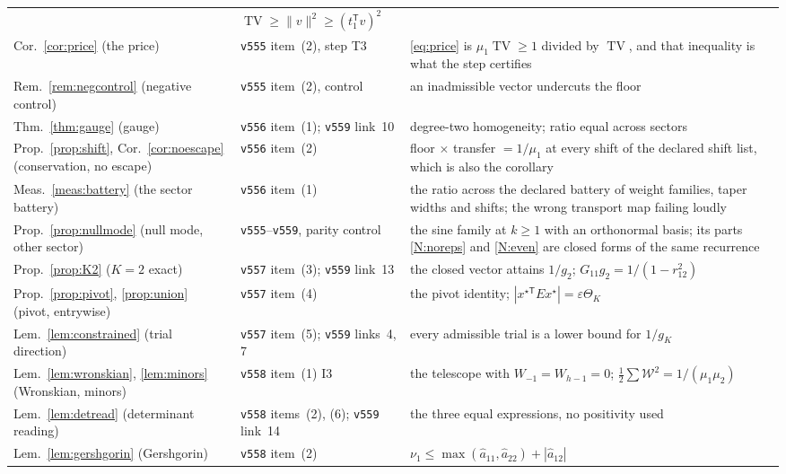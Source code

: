 \documentclass[11pt,a4paper]{article}
\theoremstyle{plain}
\theoremstyle{definition}
\newcommand{\T}{\mathsf{T}}
\newcommand{\ah}{\widehat{a}}
\newcommand{\TV}{\operatorname{TV}}
\begin{document}
{\begin{xltabular}{\textwidth}{@{}llY@{}}
  & $\TV\ge\lVert v\rVert^{2}\ge(t_1^{\T}v)^{2}$ \\
Cor.~\ref{cor:price} (the price)
  & \texttt{v555} item~(2), step T3
  & \eqref{eq:price} is $\mu_1\TV\ge1$ divided by $\TV$, and that inequality is
    what the step certifies \\
Rem.~\ref{rem:negcontrol} (negative control)
  & \texttt{v555} item~(2), control
  & an inadmissible vector undercuts the floor \\
Thm.~\ref{thm:gauge} (gauge)
  & \texttt{v556} item~(1); \texttt{v559} link~10
  & degree-two homogeneity; ratio equal across sectors \\
Prop.~\ref{prop:shift}, Cor.~\ref{cor:noescape} (conservation, no escape)
  & \texttt{v556} item~(2)
  & floor $\times$ transfer $=1/\mu_1$ at every shift of the declared shift
    list, which is also the corollary \\
Meas.~\ref{meas:battery} (the sector battery)
  & \texttt{v556} item~(1)
  & the ratio across the declared battery of weight families, taper widths and
    shifts; the wrong transport map failing loudly \\
Prop.~\ref{prop:nullmode} (null mode, other sector)
  & \texttt{v555}--\texttt{v559}, parity control
  & the sine family at $k\ge1$ with an orthonormal basis; its parts
    \ref{N:noreps} and \ref{N:even} are closed forms of the same recurrence \\
Prop.~\ref{prop:K2} ($K=2$ exact)
  & \texttt{v557} item~(3); \texttt{v559} link~13
  & the closed vector attains $1/g_2$; $G_{11}g_2=1/(1-r_{12}^{2})$ \\
Prop.~\ref{prop:pivot}, \ref{prop:union} (pivot, entrywise)
  & \texttt{v557} item~(4)
  & the pivot identity; $|x^{\star\T}Ex^{\star}|=\varepsilon\Theta_K$ \\
Lem.~\ref{lem:constrained} (trial direction)
  & \texttt{v557} item~(5); \texttt{v559} links~4, 7
  & every admissible trial is a lower bound for $1/g_K$ \\
Lem.~\ref{lem:wronskian}, \ref{lem:minors} (Wronskian, minors)
  & \texttt{v558} item~(1) I3
  & the telescope with $W_{-1}=W_{h-1}=0$;
    $\tfrac12\sum\mathcal W^{2}=1/(\mu_1\mu_2)$ \\
Lem.~\ref{lem:detread} (determinant reading)
  & \texttt{v558} items~(2), (6); \texttt{v559} link~14
  & the three equal expressions, no positivity used \\
Lem.~\ref{lem:gershgorin} (Gershgorin)
  & \texttt{v558} item~(2)
  & $\nu_1\le\max(\ah_{11},\ah_{22})+|\ah_{12}|$ \\

\end{xltabular}}
\end{document}
